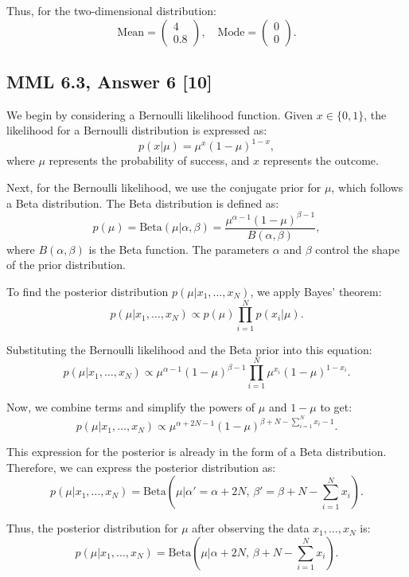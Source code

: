 \documentclass[12pt]{article}
\begin{document}
Thus, for the two-dimensional distribution:
\[
\text{Mean} = \begin{pmatrix} 4 \\ 0.8 \end{pmatrix}, \quad \text{Mode} = \begin{pmatrix} 0 \\ 0 \end{pmatrix}.
\]
\subsection*{MML 6.3, Answer 6 [10]}
We begin by considering a Bernoulli likelihood function. Given \( x \in \{0, 1\} \), the likelihood for a Bernoulli distribution is expressed as:
\[
p(x | \mu) = \mu^x (1 - \mu)^{1 - x},
\]
where \( \mu \) represents the probability of success, and \( x \) represents the outcome.

Next, for the Bernoulli likelihood, we use the conjugate prior for \( \mu \), which follows a Beta distribution. The Beta distribution is defined as:
\[
p(\mu) = \text{Beta}(\mu | \alpha, \beta) = \frac{\mu^{\alpha - 1} (1 - \mu)^{\beta - 1}}{B(\alpha, \beta)},
\]
where \( B(\alpha, \beta) \) is the Beta function. The parameters \( \alpha \) and \( \beta \) control the shape of the prior distribution.

To find the posterior distribution \( p(\mu | x_1, \dots, x_N) \), we apply Bayes' theorem:
\[
p(\mu | x_1, \dots, x_N) \propto p(\mu) \prod_{i=1}^{N} p(x_i | \mu).
\]

Substituting the Bernoulli likelihood and the Beta prior into this equation:
\[
p(\mu | x_1, \dots, x_N) \propto \mu^{\alpha - 1} (1 - \mu)^{\beta - 1} \prod_{i=1}^{N} \mu^{x_i} (1 - \mu)^{1 - x_i}.
\]

Now, we combine terms and simplify the powers of \( \mu \) and \( 1 - \mu \) to get:
\[
p(\mu | x_1, \dots, x_N) \propto \mu^{\alpha + 2N - 1} (1 - \mu)^{\beta + N - \sum_{i=1}^N x_i - 1}.
\]

This expression for the posterior is already in the form of a Beta distribution. Therefore, we can express the posterior distribution as:
\[
p(\mu | x_1, \dots, x_N) = \text{Beta} \left( \mu \bigg| \alpha' = \alpha + 2N, \, \beta' = \beta + N - \sum_{i=1}^N x_i \right).
\]

Thus, the posterior distribution for \( \mu \) after observing the data \( x_1, \dots, x_N \) is:
\[
p(\mu | x_1, \dots, x_N) = \text{Beta} \left( \mu \bigg| \alpha + 2N, \, \beta + N - \sum_{i=1}^N x_i \right).
\]
\end{document}
